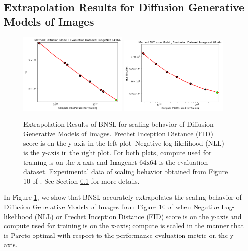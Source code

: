 \documentclass{article} %
\begin{document}

\clearpage

\clearpage


\subsection{Extrapolation Results for Diffusion Generative Models of Images}
\label{section:diffusion}

\begin{figure}[htbp]
    \centering
\includegraphics[width=0.48\textwidth]{figures/diffusion/diffusion__fid.png}
\includegraphics[width=0.48\textwidth]{figures/diffusion/diffusion__nll.png}

    \caption{
Extrapolation Results of BNSL for scaling behavior of Diffusion Generative Models of Images. Frechet Inception Distance (FID) score is on the y-axis in the left plot. Negative log-likelihood (NLL) is the y-axis in the right plot. For both plots, compute used for training is on the x-axis and Imagenet 64x64 is the evaluation dataset. Experimental data of scaling behavior obtained from Figure 10 of \cite{nichol2021improved}. See Section \ref{section:diffusion} for more details.
    }
    \label{fig:diffusion_compute_scaling}
\end{figure}

In Figure \ref{fig:diffusion_compute_scaling}, we show that BNSL accurately extrapolates the scaling behavior of Diffusion Generative Models of Images from Figure 10 of \cite{nichol2021improved} when Negative Log-likelihood (NLL) or Frechet Inception Distance (FID) score is on the y-axis and compute used for training is on the x-axis; compute is scaled in the manner that is Pareto optimal with respect to the performance evaluation metric on the y-axis.
\end{document}
